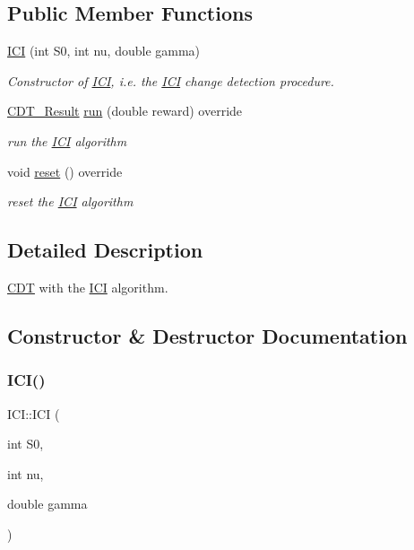 \subsection*{Public Member Functions}
\begin{DoxyCompactItemize}
\item 
\mbox{\hyperlink{class_i_c_i_a66a75673204429732da8b21435a625d4}{I\+CI}} (int S0, int nu, double gamma)
\begin{DoxyCompactList}\small\item\em Constructor of \mbox{\hyperlink{class_i_c_i}{I\+CI}}, i.\+e. the \mbox{\hyperlink{class_i_c_i}{I\+CI}} change detection procedure. \end{DoxyCompactList}\item 
\mbox{\hyperlink{class_c_d_t___result}{C\+D\+T\+\_\+\+Result}} \mbox{\hyperlink{class_i_c_i_a6a26d0c0a207ddd1f474bbdd226d82c8}{run}} (double reward) override
\begin{DoxyCompactList}\small\item\em run the \mbox{\hyperlink{class_i_c_i}{I\+CI}} algorithm \end{DoxyCompactList}\item 
void \mbox{\hyperlink{class_i_c_i_a24fe71d12a6dcb070cb87c342874fd33}{reset}} () override
\begin{DoxyCompactList}\small\item\em reset the \mbox{\hyperlink{class_i_c_i}{I\+CI}} algorithm \end{DoxyCompactList}\end{DoxyCompactItemize}


\subsection{Detailed Description}
\mbox{\hyperlink{class_c_d_t}{C\+DT}} with the \mbox{\hyperlink{class_i_c_i}{I\+CI}} algorithm. 

\subsection{Constructor \& Destructor Documentation}
\mbox{\label{class_i_c_i_a66a75673204429732da8b21435a625d4}} 
\subsubsection{\texorpdfstring{I\+C\+I()}{ICI()}}
{\footnotesize\ttfamily I\+C\+I\+::\+I\+CI (\begin{DoxyParamCaption}\item[{int}]{S0,  }\item[{int}]{nu,  }\item[{double}]{gamma }\end{DoxyParamCaption})}



